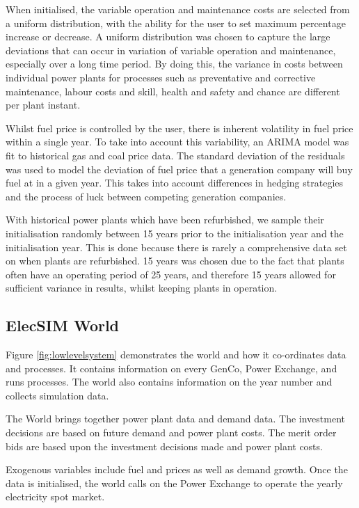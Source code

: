 When initialised, the variable operation and maintenance costs are selected from a uniform distribution, with the ability for the user to set maximum percentage increase or decrease. A uniform distribution was chosen to capture the large deviations that can occur in variation of variable operation and maintenance, especially over a long time period. By doing this, the variance in costs between individual power plants for processes such as preventative and corrective maintenance, labour costs and skill, health and safety and chance are different per plant instant.  

Whilst fuel price is controlled by the user, there is inherent volatility in fuel price within a single year. To take into account this variability, an ARIMA model was fit to historical gas and coal price data. The standard deviation of the residuals was used to model the deviation of fuel price that a generation company will buy fuel at in a given year. This takes into account differences in hedging strategies and the process of luck between competing generation companies.

With historical power plants which have been refurbished, we sample their initialisation randomly between 15 years prior to the initialisation year and the initialisation year. This is done because there is rarely a comprehensive data set on when plants are refurbished. 15 years was chosen due to the fact that plants often have an operating period of 25 years, and therefore 15 years allowed for sufficient variance in results, whilst keeping plants in operation.

\subsection{ElecSIM World}

Figure \ref{fig:lowlevelsystem} demonstrates the world and how it co-ordinates data and processes. It contains information on every GenCo, Power Exchange, and runs processes. The world also contains information on the year number and collects simulation data.

The World brings together power plant data and demand data. The investment decisions are based on future demand and power plant costs. The merit order bids are based upon the investment decisions made and power plant costs.

Exogenous variables include fuel and  prices as well as demand growth. Once the data is initialised, the world calls on the Power Exchange to operate the yearly electricity spot market.


